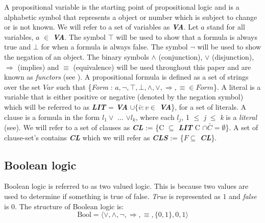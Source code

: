 \documentclass[11pt,a4paper]{report}
\begin{document}
A propositional variable is the starting point of propositional logic and is a alphabetic symbol that represents a object or number which is subject to change or is not known. We will refer to a set of variables as \textit{\textbf{VA}}. Let $a$ stand for all variables, $a$ $\in$ \textit{\textbf{VA}}. The symbol $\top$ will be used to show that a formula is always true and $\bot$ for when a formula is always false. The symbol $\neg$ will be used to show the negation of an object. The binary symbols $\land$ (conjunction), $\lor$ (disjunction), $\Rightarrow$ (implies) and $\equiv$ (equivalence) will be used throughout this paper and are known as \textit{functors} (see \cite{Marek2009Introduction}). A propositional formula is defined as a set of strings over the set $Var$ such that \{\textit{Form} : $a, \neg, \top, \bot, \land, \lor, \Rightarrow, \equiv \in Form$\}. A literal is a variable that is either positive or negative (denoted by the negation symbol) which will be referred to as \textbf{\textit{LIT}} =  \textit{\textbf{VA}} $\cup \{ \bar{v} : v \in$ \textbf{\textit{VA}}\}, for a set of literals. A clause is a formula in the form $l_1 \lor$ ... $\lor l_k$, where each $l_j$, 1 $\le$ \textit{j} $\le$ \textit{k} is a \textit{literal} (see\cite{Marek2009Introduction}). We will refer to a set of clauses as \textbf{\textit{CL}} := \{C $\subseteq$ \textbf{\textit{LIT}} C $\cap \bar{C} = \emptyset$\}. A set of clause-set's contains \textbf{\textit{CL}} which we will refer as \textbf{\textit{CLS}} := \{$F \subseteq$ \textit{\textbf{CL}}\}. 

\subsection{Boolean logic}
\label{sec:bool}

Boolean logic is referred to as two valued logic. This is because two values are used to determine if something is true of false. \emph{True} is represented as $1$ and \emph{false} is $0$. The structure of Boolean logic is:
\begin{displaymath}
\text{Bool} = \langle \lor, \land, \neg, \Rightarrow, \equiv,\{0,1\}, 0, 1 \rangle
\end{displaymath}
\end{document}
